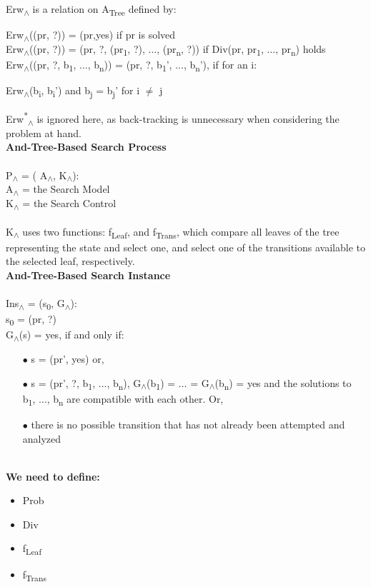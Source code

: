 \documentclass[11pt, oneside]{article}   	%
\begin{document}
\noindent Erw\textsubscript{$\land$} is a relation on A\textsubscript{Tree} defined by:

\indent Erw\textsubscript{$\land$}((pr, ?)) = (pr,yes) if pr is solved\\
\indent Erw\textsubscript{$\land$}((pr, ?)) = (pr, ?, (pr\textsubscript{1}, ?), $\ldots$, (pr\textsubscript{n}, ?)) if Div(pr, pr\textsubscript{1}, $\ldots$, pr\textsubscript{n}) holds\\
\indent Erw\textsubscript{$\land$}((pr, ?, b\textsubscript{1}, $\ldots$, b\textsubscript{n})) = (pr, ?, b\textsubscript{1}', $\ldots$, b\textsubscript{n}'), if for an i:\\
\centerline{Erw\textsubscript{$\land$}(b\textsubscript{i}, b\textsubscript{i}') and b\textsubscript{j} = b\textsubscript{j}' for i $\neq$ j}

\noindent Erw\textsuperscript{*}\textsubscript{$\land$} is ignored here, as back-tracking is unnecessary when considering the problem at hand.\\

\noindent \textbf{And-Tree-Based Search Process}\\\\
P\textsubscript{$\land$} = ( A\textsubscript{$\land$}, K\textsubscript{$\land$}):\\
\indent A\textsubscript{$\land$} = the Search Model\\
\indent K\textsubscript{$\land$} = the Search Control\\\\
\noindent K\textsubscript{$\land$} uses two functions: f\textsubscript{Leaf}, and f\textsubscript{Trans}, which compare all leaves of the tree representing the state and select one, and select one of the transitions available to the selected leaf, respectively.\\

\noindent \textbf{And-Tree-Based Search Instance}\\\\
Ins\textsubscript{$\land$} = (s\textsubscript{0}, G\textsubscript{$\land$}):\\
\indent s\textsubscript{0} = (pr, ?)\\
\indent G\textsubscript{$\land$}(s) = yes, if and only if:
\begin{enumerate}[leftmargin=25mm,topsep=0pt]
\item[$\bullet$] s = (pr', yes) or,
\item[$\bullet$] s = (pr', ?, b\textsubscript{1}, $\ldots$, b\textsubscript{n}), G\textsubscript{$\land$}(b\textsubscript{1}) = $\ldots$ = G\textsubscript{$\land$}(b\textsubscript{n}) = yes and the solutions to b\textsubscript{1}, $\ldots$, b\textsubscript{n} are compatible with each other. Or,
\item[$\bullet$] there is no possible transition that has not already been attempted and analyzed
\end{enumerate}

\noindent \textbf{\\We need to define:}
\begin{itemize}[topsep=0pt]
\item Prob
\item Div
\item f\textsubscript{Leaf}
\item f\textsubscript{Trans}
\end{itemize}
\end{document}
